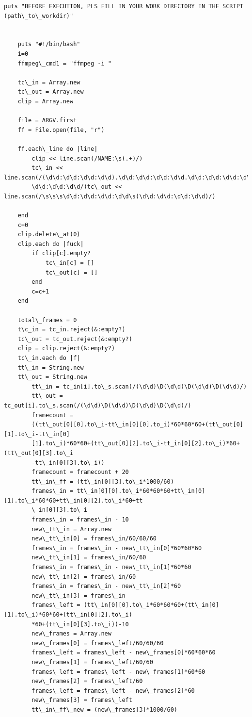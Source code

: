 \begin{lstlisting}[breaklines=true, breakatwhitespace=true]
    puts "BEFORE EXECUTION, PLS FILL IN YOUR WORK DIRECTORY IN THE SCRIPT (path\_to\_workdir)"
     
     
    puts "#!/bin/bash"
    i=0
    ffmpeg\_cmd1 = "ffmpeg -i " 
     
    tc\_in = Array.new
    tc\_out = Array.new
    clip = Array.new
     
    file = ARGV.first
    ff = File.open(file, "r")
     
    ff.each\_line do |line|
    	clip << line.scan(/NAME:\s(.+)/)
    	tc\_in << line.scan(/(\d\d:\d\d:\d\d:\d\d).\d\d:\d\d:\d\d:\d\d.\d\d:\d\d:\d\d:\d\d.\d\d:
    	\d\d:\d\d:\d\d/)tc\_out << line.scan(/\s\s\s\d\d:\d\d:\d\d:\d\d\s(\d\d:\d\d:\d\d:\d\d)/)
     
    end
    c=0
    clip.delete\_at(0)
    clip.each do |fuck|
    	if clip[c].empty?
    		tc\_in[c] = []
    		tc\_out[c] = []
    	end
    	c=c+1
    end
     
    total\_frames = 0
    t\c_in = tc_in.reject(&:empty?)
    tc\_out = tc_out.reject(&:empty?)
    clip = clip.reject(&:empty?)
    tc\_in.each do |f|
    tt\_in = String.new
    tt\_out = String.new
    	tt\_in = tc_in[i].to\_s.scan(/(\d\d)\D(\d\d)\D(\d\d)\D(\d\d)/)
    	tt\_out = tc_out[i].to\_s.scan(/(\d\d)\D(\d\d)\D(\d\d)\D(\d\d)/)
    	framecount = 
    	((tt\_out[0][0].to\_i-tt\_in[0][0].to_i)*60*60*60+(tt\_out[0][1].to\_i-tt\_in[0]
    	[1].to\_i)*60*60+(tt\_out[0][2].to\_i-tt_in[0][2].to\_i)*60+(tt\_out[0][3].to\_i
    	-tt\_in[0][3].to\_i))
    	framecount = framecount + 20
    	tt\_in\_ff = (tt\_in[0][3].to\_i*1000/60)
    	frames\_in = tt\_in[0][0].to\_i*60*60*60+tt\_in[0][1].to\_i*60*60+tt\_in[0][2].to\_i*60+tt
    	\_in[0][3].to\_i
    	frames\_in = frames\_in - 10
    	new\_tt\_in = Array.new
    	new\_tt\_in[0] = frames\_in/60/60/60
    	frames\_in = frames\_in - new\_tt\_in[0]*60*60*60
    	new\_tt\_in[1] = frames\_in/60/60
    	frames\_in = frames\_in - new\_tt\_in[1]*60*60
    	new\_tt\_in[2] = frames\_in/60
    	frames\_in = frames\_in - new\_tt\_in[2]*60
    	new\_tt\_in[3] = frames\_in
    	frames\_left = (tt\_in[0][0].to\_i*60*60*60+(tt\_in[0][1].to\_i)*60*60+(tt\_in[0][2].to\_i)
    	*60+(tt\_in[0][3].to\_i))-10
    	new\_frames = Array.new
    	new\_frames[0] = frames\_left/60/60/60
    	frames\_left = frames\_left - new\_frames[0]*60*60*60
    	new\_frames[1] = frames\_left/60/60
    	frames\_left = frames\_left - new\_frames[1]*60*60
    	new\_frames[2] = frames\_left/60
    	frames\_left = frames\_left - new\_frames[2]*60
    	new\_frames[3] = frames\_left
    	tt\_in\_ff\_new = (new\_frames[3]*1000/60)
     

\end{lstlisting}
